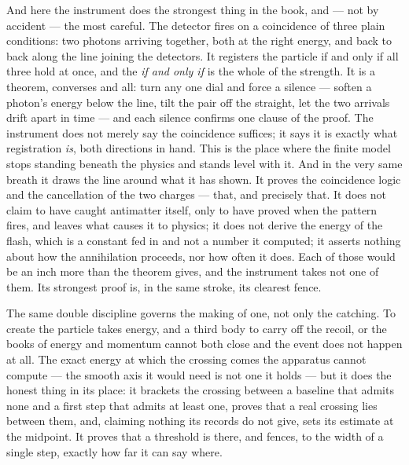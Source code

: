 And here the instrument does the strongest thing in the book, and --- not by accident --- the most careful. The
detector fires on a coincidence of three plain conditions: two photons arriving together, both at the right
energy, and back to back along the line joining the detectors. It registers the particle if and only if all
three hold at once, and the \emph{if and only if} is the whole of the strength. It is a theorem, converses and
all: turn any one dial and force a silence --- soften a photon's energy below the line, tilt the pair off the
straight, let the two arrivals drift apart in time --- and each silence confirms one clause of the proof. The
instrument does not merely say the coincidence suffices; it says it is exactly what registration \emph{is}, both
directions in hand. This is the place where the finite model stops standing beneath the physics and stands level
with it. And in the very same breath it draws the line around what it has shown. It proves the coincidence logic
and the cancellation of the two charges --- that, and precisely that. It does not claim to have caught
antimatter itself, only to have proved when the pattern fires, and leaves what causes it to physics; it does not
derive the energy of the flash, which is a constant fed in and not a number it computed; it asserts nothing
about how the annihilation proceeds, nor how often it does. Each of those would be an inch more than the theorem
gives, and the instrument takes not one of them. Its strongest proof is, in the same stroke, its clearest fence.

The same double discipline governs the making of one, not only the catching. To create the particle takes
energy, and a third body to carry off the recoil, or the books of energy and momentum cannot both close and the
event does not happen at all. The exact energy at which the crossing comes the apparatus cannot compute --- the
smooth axis it would need is not one it holds --- but it does the honest thing in its place: it brackets the
crossing between a baseline that admits none and a first step that admits at least one, proves that a real
crossing lies between them, and, claiming nothing its records do not give, sets its estimate at the midpoint. It
proves that a threshold is there, and fences, to the width of a single step, exactly how far it can say where.

